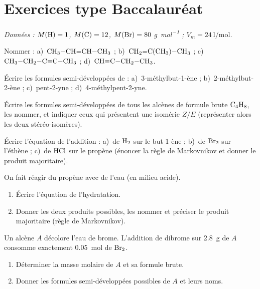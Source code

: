 \section{Exercices type Baccalauréat}
\textit{Données : $M(\ce{H})=1$, $M(\ce{C})=12$, $M(\ce{Br})=80$ \si{\gram\per\mol} ;
$V_m=\SI{24}{\litre\per\mol}$.}


\exo{} Nommer : a)~$\ce{CH3-CH=CH-CH3}$ ; b)~$\ce{CH2=C(CH3)-CH3}$ ;
c)~$\ce{CH3-CH2-C#C-CH3}$ ; d)~$\ce{CH#C-CH2-CH3}$.

\exo{} Écrire les formules semi-développées de : a)~3-méthylbut-1-ène ;
b)~2-méthylbut-2-ène ; c)~pent-2-yne ; d)~4-méthylpent-2-yne.

\exo{} Écrire les formules semi-développées de tous les alcènes de formule
brute $\ce{C4H8}$, les nommer, et indiquer ceux qui présentent une isomérie $Z/E$
(représenter alors les deux stéréo-isomères).


\exo{} Écrire l'équation de l'addition : a)~de $\ce{H2}$ sur le but-1-ène ;
b)~de $\ce{Br2}$ sur l'éthène ; c)~de $\ce{HCl}$ sur le propène (énoncer la règle de
Markovnikov et donner le produit majoritaire).

\exo{} On fait réagir du propène avec de l'eau (en milieu acide).
\begin{enumerate}[label=\arabic*)]
\item Écrire l'équation de l'hydratation.
\item Donner les deux produits possibles, les nommer et préciser le produit
majoritaire (règle de Markovnikov).
\end{enumerate}

\exo{} Un alcène $A$ décolore l'eau de brome. L'addition de dibrome sur
\SI{2.8}{\gram} de $A$ consomme exactement \SI{0.05}{\mol} de $\ce{Br2}$.
\begin{enumerate}[label=\arabic*)]
\item Déterminer la masse molaire de $A$ et sa formule brute.
\item Donner les formules semi-développées possibles de $A$ et leurs noms.
\end{enumerate}

